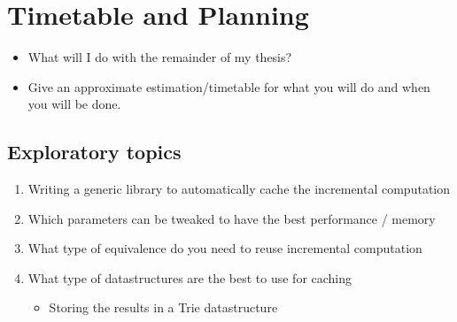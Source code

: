 \section{Timetable and Planning}
\begin{itemize}
    \item What will I do with the remainder of my thesis?
    \item Give an approximate estimation/timetable for what you will do and when you will be done.    
\end{itemize}

\subsection{Exploratory topics}
\begin{enumerate}
    \item Writing a generic library to automatically cache the incremental computation
    \item Which parameters can be tweaked to have the best performance / memory
    \item What type of equivalence do you need to reuse incremental computation
    \item What type of datastructures are the best to use for caching
    \begin{itemize}
        \item Storing the results in a Trie datastructure
    \end{itemize}
\end{enumerate}

\newpage
